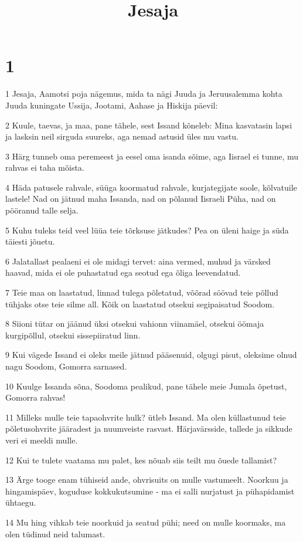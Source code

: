 

\title{Jesaja}

\chapter{1}

\par 1 Jesaja, Aamotsi poja nägemus, mida ta nägi Juuda ja Jeruusalemma kohta Juuda kuningate Ussija, Jootami, Aahase ja Hiskija päevil:
\par 2 Kuule, taevas, ja maa, pane tähele, sest Issand kõneleb: Mina kasvatasin lapsi ja lasksin neil sirguda suureks, aga nemad astusid üles mu vastu.
\par 3 Härg tunneb oma peremeest ja eesel oma isanda sõime, aga Iisrael ei tunne, mu rahvas ei taha mõista.
\par 4 Häda patusele rahvale, süüga koormatud rahvale, kurjategijate soole, kõlvatuile lastele! Nad on jätnud maha Issanda, nad on põlanud Iisraeli Püha, nad on pööranud talle selja.
\par 5 Kuhu tuleks teid veel lüüa teie tõrksuse jätkudes? Pea on üleni haige ja süda täiesti jõuetu.
\par 6 Jalatallast pealaeni ei ole midagi tervet: aina vermed, muhud ja värsked haavad, mida ei ole puhastatud ega seotud ega õliga leevendatud.
\par 7 Teie maa on laastatud, linnad tulega põletatud, võõrad söövad teie põllud tühjaks otse teie silme all. Kõik on laastatud otsekui segipaisatud Soodom.
\par 8 Siioni tütar on jäänud üksi otsekui vahionn viinamäel, otsekui öömaja kurgipõllul, otsekui sissepiiratud linn.
\par 9 Kui vägede Issand ei oleks meile jätnud pääsenuid, olgugi pisut, oleksime olnud nagu Soodom, Gomorra sarnased.
\par 10 Kuulge Issanda sõna, Soodoma pealikud, pane tähele meie Jumala õpetust, Gomorra rahvas!
\par 11 Milleks mulle teie tapaohvrite hulk? ütleb Issand. Ma olen küllastunud teie põletusohvrite jääradest ja nuumveiste rasvast. Härjavärsside, tallede ja sikkude veri ei meeldi mulle.
\par 12 Kui te tulete vaatama mu palet, kes nõuab siis teilt mu õuede tallamist?
\par 13 Ärge tooge enam tühiseid ande, ohvrisuits on mulle vastumeelt. Noorkuu ja hingamispäev, koguduse kokkukutsumine - ma ei salli nurjatust ja pühapidamist ühtaegu.
\par 14 Mu hing vihkab teie noorkuid ja seatud pühi; need on mulle koormaks, ma olen tüdinud neid talumast.
